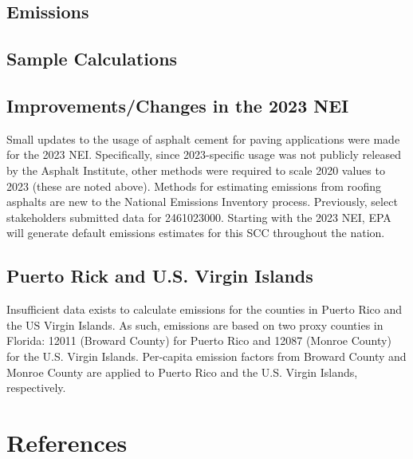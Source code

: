 \documentclass[
  11pt,
  oneside]{book}
\begin{document}
\subsection{Emissions}\label{emissions-1}

\subsection{Sample Calculations}\label{sample-calculations-1}

\subsection{Improvements/Changes in the 2023 NEI}\label{improvementschanges-in-the-2023-nei-1}

Small updates to the usage of asphalt cement for paving applications were made for the 2023 NEI. Specifically, since 2023-specific usage was not publicly released by the Asphalt Institute, other methods were required to scale 2020 values to 2023 (these are noted above). Methods for estimating emissions from roofing asphalts are new to the National Emissions Inventory process. Previously, select stakeholders submitted data for 2461023000. Starting with the 2023 NEI, EPA will generate default emissions estimates for this SCC throughout the nation.

\subsection{Puerto Rick and U.S. Virgin Islands}\label{puerto-rick-and-u.s.-virgin-islands-1}

Insufficient data exists to calculate emissions for the counties in Puerto Rico and the US Virgin Islands. As such, emissions are based on two proxy counties in Florida: 12011 (Broward County) for Puerto Rico and 12087 (Monroe County) for the U.S. Virgin Islands. Per-capita emission factors from Broward County and Monroe County are applied to Puerto Rico and the U.S. Virgin Islands, respectively.

\section{References}\label{references}
\end{document}
